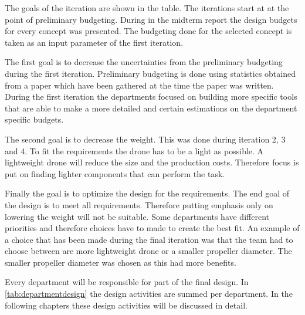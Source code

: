 The goals of the iteration are shown in the table. The iterations start at at the point of preliminary budgeting. During in the midterm report\cite{midterm} the design budgets for every concept was presented. The budgeting done for the selected concept is taken as an input parameter of the first iteration. 

The first goal is to decrease the uncertainties from the preliminary budgeting during the first iteration. Preliminary budgeting is done using statistics obtained from a paper which have been gathered at the time the paper was written. During the first iteration the departments focused on building more specific tools that are able to make a more detailed and certain estimations on the department specific budgets.

The second goal is to decrease the weight. This was done during iteration 2, 3 and 4. To fit the requirements the drone has to be a light as possible. A lightweight drone will reduce the size and the production costs. Therefore focus is put on finding lighter components that can perform the task.

Finally the goal is to optimize the design for the requirements. The end goal of the design is to meet all requirements. Therefore putting emphasis only on lowering the weight will not be suitable. Some departments have different priorities and therefore choices have to made to create the best fit. An example of a choice that has been made during the final iteration was that the team had to choose between are more lightweight drone or a smaller propeller diameter. The smaller propeller diameter was chosen as this had more benefits.

Every department will be responsible for part of the final design. In \autoref{tab:departmentdesign} the design activities are summed per department. In the following chapters these design activities will be discussed in detail.

